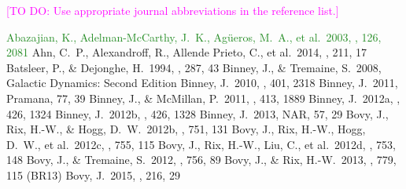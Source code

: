 \documentclass[iop,revtex4]{emulateapj}
\newcommand{\NEW}[1]{\textcolor{ForestGreen}{#1}}
\newcommand{\Wilma}[1]{\textcolor{Magenta}{#1}}
\begin{document}
\Wilma{[TO DO: Use appropriate journal abbreviations in the reference list.]}
\begin{thebibliography}{}
 \NEW{Abazajian, K., Adelman-McCarthy, J.~K., Ag{\"u}eros, M.~A., et al.\ 2003, \aj, 126, 2081}
 Ahn, C.~P., Alexandroff, R., Allende Prieto, C., et al.\ 2014, \apjs, 211, 17 
 Batsleer, P., \& Dejonghe, H.\ 1994, \aap, 287, 43
 Binney, J., \& Tremaine, S.\ 2008, Galactic Dynamics: Second Edition
 Binney, J.\ 2010, \mnras, 401, 2318
 Binney, J.\ 2011, Pramana, 77, 39
 Binney, J., \& McMillan, P.\ 2011, \mnras, 413, 1889
 Binney, J.\ 2012a, \mnras, 426, 1324
 Binney, J.\ 2012b, \mnras, 426, 1328
 Binney, J.\ 2013, NAR, 57, 29 
 Bovy, J., Rix, H.-W., \& Hogg, D.~W.\ 2012b, \apj, 751, 131
 Bovy, J., Rix, H.-W., Hogg, D.~W., et al.\ 2012c, \apj, 755, 115 
 Bovy, J., Rix, H.-W., Liu, C., et al.\ 2012d, \apj, 753, 148
 Bovy, J., \& Tremaine, S.\ 2012, \apj, 756, 89
 Bovy, J., \& Rix, H.-W.\ 2013, \apj, 779, 115 (BR13)
 Bovy, J.\ 2015, \apjs, 216, 29


\end{thebibliography}
\end{document}
